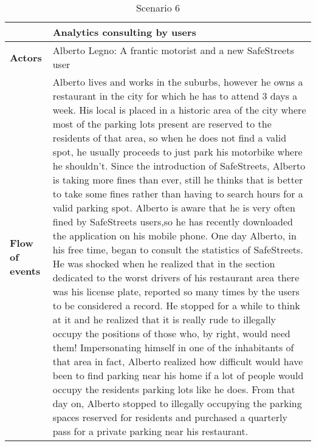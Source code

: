 \begin{table}[!htbp]
	\centering
\begin{tabular}{lp{9.8cm}}
\hline
\bf\large  &\bf\large Analytics consulting by users\\
\hline
\hline

\bf Actors&Alberto Legno: A frantic motorist and a new SafeStreets user\\
\hline
\bf Flow of events&
Alberto lives and works in the suburbs, however he owns a restaurant in the city for which he has to attend 3 days a week.
His local is placed in a historic area of the city where most of the parking lots present are reserved to the residents of that area, so when he does not find a valid spot, he usually proceeds to just park his motorbike where he shouldn't.
Since the introduction of SafeStreets, Alberto is taking more fines than ever, still he thinks that is better to take some fines rather than having to search hours for a valid parking spot.
Alberto is aware that he is very often fined by SafeStreets users,so he has recently downloaded the application on his mobile phone. One day Alberto, in his free time, began to consult the statistics of SafeStreets. He was shocked when he realized that in the section dedicated to the worst drivers of his restaurant area there was his license plate, reported so many times by the users to be considered a record.
He stopped for a while to think at it and he realized that it is really rude to illegally occupy the positions of those who, by right, would need them! Impersonating himself in one of the inhabitants of that area in fact, Alberto realized how difficult would have been to find parking near his home if a lot of people would occupy the residents parking lots like he does.
From that day on, Alberto stopped to illegally occupying the parking spaces reserved for residents and purchased a quarterly pass for a private parking near his restaurant.
\end{tabular}
\caption{Scenario 6} 
\label{tab:scenariosix}
\end{table}